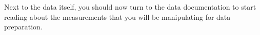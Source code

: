 Next to the data itself, you should now turn to the data documentation to start reading about the measurements that you will be manipulating for data preparation.%

%
%
%
%
%
%
%

  
